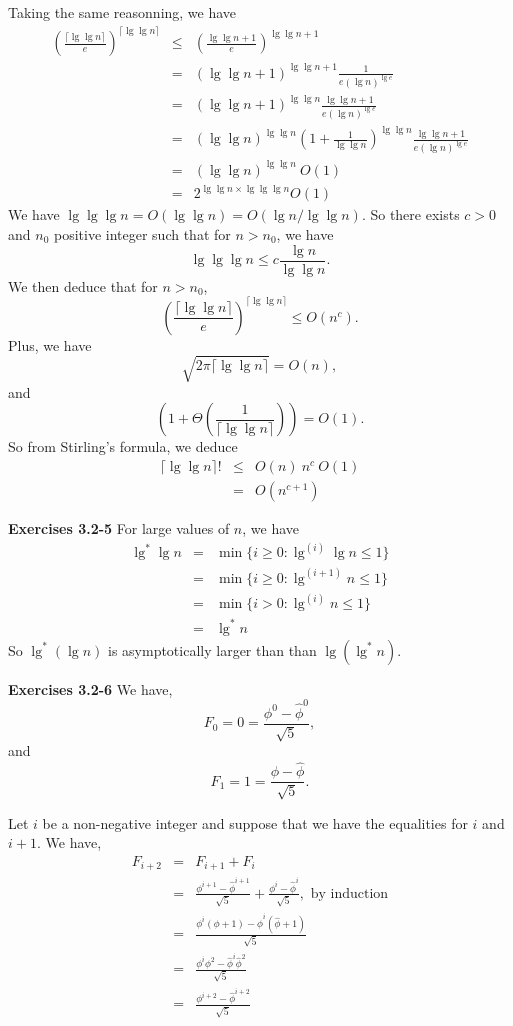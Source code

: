 \documentclass[a4paper,12pt]{article}
\newcommand{\newpar}[1]
{\bigskip \noindent \textbf{Exercises #1} \newline}
\begin{document}
Taking the same reasonning, we have
\begin{eqnarray*}
\left(\frac{\lceil \lg \lg n\rceil}{e}\right)^{\lceil \lg \lg
  n\rceil}&\le&
\left(\frac{\lg \lg n + 1}{e}\right)^{\lg \lg n + 1} \\ &=&
(\lg \lg n + 1)^{\lg \lg n + 1} \frac{1}{e (\lg n)^{\lg e}} \\ &=&
(\lg \lg n + 1)^{\lg \lg n} 
\frac{\lg \lg n + 1}{e (\lg n)^{\lg e}} \\ &=&
(\lg \lg n)^{\lg \lg n}\left(1 + \frac{1}{\lg \lg n}\right)^{\lg \lg
  n} \frac{\lg \lg n + 1}{e (\lg n)^{\lg e}} \\&=&
(\lg \lg n)^{\lg \lg n}\ O(1) \\ &=&
2^{\lg \lg n \times \lg \lg \lg n} O(1)
\end{eqnarray*}
We have $\lg \lg \lg n = O(\lg \lg n) = O(\lg n/\lg \lg n)$.  So
there exists $c > 0$ and $n_0$ positive integer such that for $n >
n_0$, we have
\[ \lg \lg \lg n \le c \frac{\lg n}{\lg \lg n}.\]
We then deduce that for $n > n_0$,
\[\left(\frac{\lceil \lg \lg n\rceil}{e}\right)^{\lceil \lg \lg
  n\rceil}\le O(n^c).\]
Plus, we have
\[ \sqrt{2\pi \lceil \lg \lg n\rceil} = O(n),\]
and
\[\left(1 + \Theta\left(\frac{1}{\lceil \lg \lg n\rceil}\right)
\right) = O(1).\]
So from Stirling's formula, we deduce
\begin{eqnarray*}
\lceil \lg \lg n\rceil ! &\le& O(n)\ n^c\ O(1) \\
&=& O(n^{c+1})
\end{eqnarray*}

\newpar{3.2-5}
For large values of $n$, we have
\begin{eqnarray*}
\lg^* \lg n &=& \min\{i \ge 0: \lg^{(i)}\lg n \le 1\} \\
&=& \min\{i \ge 0: \lg^{(i+1)} n \le 1\} \\
&=& \min\{i > 0: \lg^{(i)} n \le 1\} \\
&=& \lg^* n
\end{eqnarray*}
So $\lg^*(\lg n)$ is asymptotically larger than than $\lg(\lg^*n)$.

\newpar{3.2-6}
We have,
\[ F_0 = 0 = \frac{\phi^0 - {\hat{\phi}}^0}{\sqrt{5}},\]
and
\[ F_1 = 1 = \frac{\phi - \hat{\phi}}{\sqrt{5}}.\]

\medskip  Let $i$ be a non-negative integer and suppose that
we have the equalities for $i$ and $i+1$.  We have,
\begin{eqnarray*}
F_{i+2} &=& F_{i+1} + F_i \\
&=& \frac{\phi^{i+1} - {\hat{\phi}}^{i+1}}{\sqrt{5}} +
\frac{\phi^i - {\hat{\phi}}^i}{\sqrt{5}}, \mbox{ by induction} \\
&=& \frac{\phi^i(\phi+1) - {\hat{\phi}}^i(\hat{\phi} + 1)}
{\sqrt{5}} \\
&=& \frac{\phi^i \phi^2 - {\hat{\phi}}^i {\hat{\phi}}^2}{\sqrt{5}} \\
&=& \frac{\phi^{i+2} - {\hat{\phi}}^{i+2}}{\sqrt{5}} \\
\end{eqnarray*}
\end{document}
